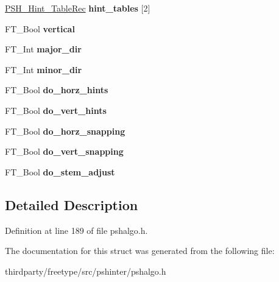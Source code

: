 \begin{DoxyCompactItemize}
\hyperlink{struct_p_s_h___hint___table_rec__}{P\+S\+H\+\_\+\+Hint\+\_\+\+Table\+Rec} {\bfseries hint\+\_\+tables} \mbox{[}2\mbox{]}
\item 
\mbox{\label{struct_p_s_h___glyph_rec___a8e46f4d12a582fdf1bb79bfef5d458f1}} 
F\+T\+\_\+\+Bool {\bfseries vertical}
\item 
\mbox{\label{struct_p_s_h___glyph_rec___aa11d8e3920a93894ef4e4c379e852f72}} 
F\+T\+\_\+\+Int {\bfseries major\+\_\+dir}
\item 
\mbox{\label{struct_p_s_h___glyph_rec___a038f2a1315e957041a969f0ee95380f2}} 
F\+T\+\_\+\+Int {\bfseries minor\+\_\+dir}
\item 
\mbox{\label{struct_p_s_h___glyph_rec___ab5785a8d814b94b34dc589b99aa8786f}} 
F\+T\+\_\+\+Bool {\bfseries do\+\_\+horz\+\_\+hints}
\item 
\mbox{\label{struct_p_s_h___glyph_rec___ad10d5dab79c9c7d5ba4ad6dcfebd355d}} 
F\+T\+\_\+\+Bool {\bfseries do\+\_\+vert\+\_\+hints}
\item 
\mbox{\label{struct_p_s_h___glyph_rec___adf38cde40c655af41a1a45a5590ff45c}} 
F\+T\+\_\+\+Bool {\bfseries do\+\_\+horz\+\_\+snapping}
\item 
\mbox{\label{struct_p_s_h___glyph_rec___aab0c5919fb0901e0b41c7fca35084044}} 
F\+T\+\_\+\+Bool {\bfseries do\+\_\+vert\+\_\+snapping}
\item 
\mbox{\label{struct_p_s_h___glyph_rec___ac9ac7c11e8e306b9cf605ff1d7f0fc56}} 
F\+T\+\_\+\+Bool {\bfseries do\+\_\+stem\+\_\+adjust}
\end{DoxyCompactItemize}


\subsection{Detailed Description}


Definition at line 189 of file pshalgo.\+h.



The documentation for this struct was generated from the following file\+:\begin{DoxyCompactItemize}
\item 
thirdparty/freetype/src/pshinter/pshalgo.\+h\end{DoxyCompactItemize}
